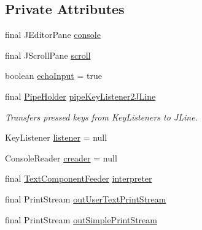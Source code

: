\subsection*{Private Attributes}
\begin{DoxyCompactItemize}
\item 
final J\+Editor\+Pane \hyperlink{classgov_1_1nasa_1_1jpf_1_1inspector_1_1frontends_1_1jpfshell_1_1gui_1_1_swing_terminal_a87c9b71bc01bfcee4d8e6741aac6bc85}{console}
\item 
final J\+Scroll\+Pane \hyperlink{classgov_1_1nasa_1_1jpf_1_1inspector_1_1frontends_1_1jpfshell_1_1gui_1_1_swing_terminal_aeb4edd324a20affd3590b53878268423}{scroll}
\item 
boolean \hyperlink{classgov_1_1nasa_1_1jpf_1_1inspector_1_1frontends_1_1jpfshell_1_1gui_1_1_swing_terminal_ad07d8fb02db861cc5f529dc87b0d6d77}{echo\+Input} = true
\item 
final \hyperlink{classgov_1_1nasa_1_1jpf_1_1inspector_1_1frontends_1_1jpfshell_1_1gui_1_1_pipe_holder}{Pipe\+Holder} \hyperlink{classgov_1_1nasa_1_1jpf_1_1inspector_1_1frontends_1_1jpfshell_1_1gui_1_1_swing_terminal_a2badde6f25f6dd8f3b3b60714cc3105a}{pipe\+Key\+Listener2\+J\+Line}
\begin{DoxyCompactList}\small\item\em Transfers pressed keys from Key\+Listeners to J\+Line. \end{DoxyCompactList}\item 
Key\+Listener \hyperlink{classgov_1_1nasa_1_1jpf_1_1inspector_1_1frontends_1_1jpfshell_1_1gui_1_1_swing_terminal_ac92c814365b122f6777a14c659206b9f}{listener} = null
\item 
Console\+Reader \hyperlink{classgov_1_1nasa_1_1jpf_1_1inspector_1_1frontends_1_1jpfshell_1_1gui_1_1_swing_terminal_ae5664b92a4e5fd82f950269d95392107}{creader} = null
\item 
final \hyperlink{classgov_1_1nasa_1_1jpf_1_1inspector_1_1frontends_1_1jpfshell_1_1gui_1_1_text_component_feeder}{Text\+Component\+Feeder} \hyperlink{classgov_1_1nasa_1_1jpf_1_1inspector_1_1frontends_1_1jpfshell_1_1gui_1_1_swing_terminal_a87d4f7277418a07e4281823b9e90e302}{interpreter}
\item 
final Print\+Stream \hyperlink{classgov_1_1nasa_1_1jpf_1_1inspector_1_1frontends_1_1jpfshell_1_1gui_1_1_swing_terminal_a858dd7cfff236d8457477e83c83dc3a7}{out\+User\+Text\+Print\+Stream}
\item 
final Print\+Stream \hyperlink{classgov_1_1nasa_1_1jpf_1_1inspector_1_1frontends_1_1jpfshell_1_1gui_1_1_swing_terminal_a7152201ad331852ceb365cee862c63a3}{out\+Simple\+Print\+Stream}
\end{DoxyCompactItemize}
